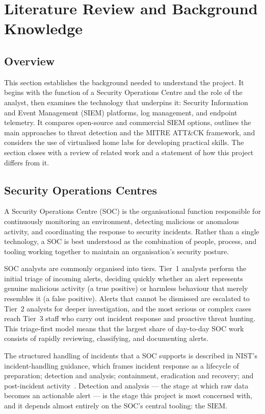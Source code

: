 \section{Literature Review and Background Knowledge}
\label{sec:litreview}

\subsection{Overview}

This section establishes the background needed to understand the project. It
begins with the function of a Security Operations Centre and the role of the
analyst, then examines the technology that underpins it: Security Information
and Event Management (SIEM) platforms, log management, and endpoint telemetry.
It compares open-source and commercial SIEM options, outlines the main
approaches to threat detection and the MITRE ATT\&CK framework, and considers
the use of virtualised home labs for developing practical skills. The section
closes with a review of related work and a statement of how this project
differs from it.

\subsection{Security Operations Centres}

A Security Operations Centre (SOC) is the organisational function responsible
for continuously monitoring an environment, detecting malicious or anomalous
activity, and coordinating the response to security incidents. Rather than a
single technology, a SOC is best understood as the combination of people,
process, and tooling working together to maintain an organisation's security
posture.

SOC analysts are commonly organised into tiers. Tier~1 analysts perform the
initial triage of incoming alerts, deciding quickly whether an alert
represents genuine malicious activity (a true positive) or harmless behaviour
that merely resembles it (a false positive). Alerts that cannot be dismissed
are escalated to Tier~2 analysts for deeper investigation, and the most
serious or complex cases reach Tier~3 staff who carry out incident response
and proactive threat hunting. This triage-first model means that the largest
share of day-to-day SOC work consists of rapidly reviewing, classifying, and
documenting alerts.

The structured handling of incidents that a SOC supports is described in
NIST's incident-handling guidance, which frames incident response as a
lifecycle of preparation; detection and analysis; containment, eradication and
recovery; and post-incident activity~\cite{nist80061}. Detection and analysis
--- the stage at which raw data becomes an actionable alert --- is the stage
this project is most concerned with, and it depends almost entirely on the
SOC's central tooling: the SIEM.

